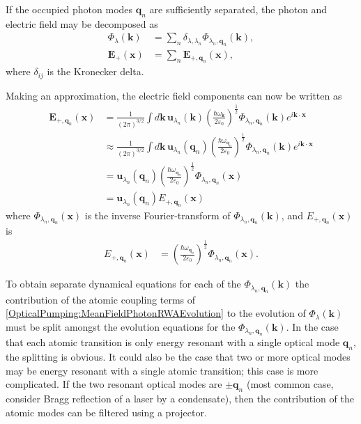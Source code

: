 If the occupied photon modes $\bm{q}_n$ are sufficiently separated, the photon and electric field may be decomposed as
\begin{align}
    \Phi_\lambda(\bm{k}) &= \sum_n \delta_{\lambda, \lambda_n} \Phi_{\lambda_n,\bm{q}_n}(\bm{k}), \\
    \bm{E}_+(\bm{x}) &= \sum_n \bm{E}_{+,\bm{q}_n}(\bm{x}),
\end{align}
where $\delta_{ij}$ is the Kronecker delta.

Making an approximation, the electric field components can now be written as
\begin{align}
    \bm{E}_{+, \bm{q}_n}(\bm{x}) &= \frac{1}{(2\pi)^{3/2}} \int d \bm{k}\, \bm{u}_{\lambda_n} (\bm{k}) \left(\frac{\hbar \omega_{\bm{k}}}{2\varepsilon_0}\right)^{\frac{1}{2}} \Phi_{\lambda_n, \bm{q}_n}(\bm{k}) e^{i \bm{k}\cdot \bm{x}}\\
    &\approx \frac{1}{(2\pi)^{3/2}} \int d \bm{k}\, \bm{u}_{\lambda_n}(\bm{q}_n) \left( \frac{\hbar \omega_{\bm{q}_n}}{2\varepsilon_0}\right)^{\frac{1}{2}} \Phi_{\lambda_n, \bm{q}_n}(\bm{k}) e^{i \bm{k}\cdot \bm{x}}\\
   &= \bm{u}_{\lambda_n}(\bm{q}_n) \left( \frac{\hbar \omega_{\bm{q}_n}}{2\varepsilon_0}\right)^{\frac{1}{2}} \Phi_{\lambda_n, \bm{q}_n} (\bm{x}) \\
   &= \bm{u}_{\lambda_n}(\bm{q}_n) E_{+, \bm{q}_n}(\bm{x})
\end{align}
where $\Phi_{\lambda_n, \bm{q}_n}(\bm{x})$ is the inverse Fourier-transform of $\Phi_{\lambda_n, \bm{q}_n}(\bm{k})$, and $E_{+, \bm{q}_n}(\bm{x})$ is
\begin{align}
    E_{+, \bm{q}_n}(\bm{x}) &= \left( \frac{\hbar \omega_{\bm{q}_n}}{2 \varepsilon_0}\right)^{\frac{1}{2}} \Phi_{\lambda_n, \bm{q}_n}(\bm{x}).
\end{align}

To obtain separate dynamical equations for each of the $\Phi_{\lambda_n, \bm{q}_n}(\bm{k})$ the contribution of the atomic coupling terms of \eqref{OpticalPumping:MeanFieldPhotonRWAEvolution} to the evolution of $\Phi_\lambda(\bm{k})$ must be split amongst the evolution equations for the $\Phi_{\lambda_n, \bm{q}_n}(\bm{k})$.  In the case that each atomic transition is only energy resonant with a single optical mode $\bm{q}_n$, the splitting is obvious.  It could also be the case that two or more optical modes may be energy resonant with a single atomic transition; this case is more complicated.  If the two resonant optical modes are $\pm \bm{q}_n$ (most common case, consider Bragg reflection of a laser by a condensate), then the contribution of the atomic modes can be filtered using a projector.

